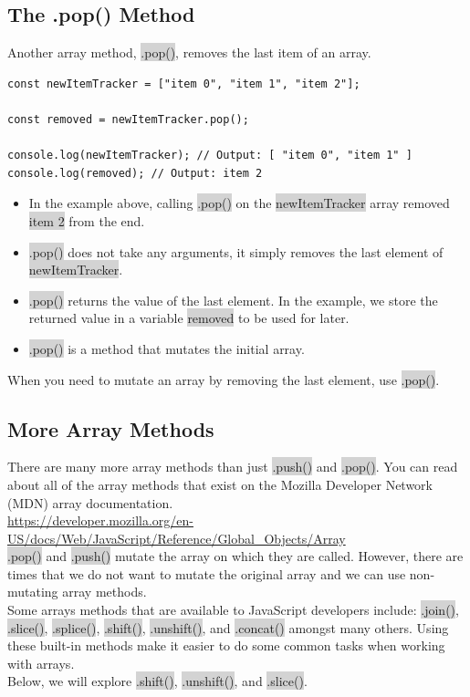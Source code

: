 \documentclass[11pt]{article}
\begin{document}
\subsection{The .pop() Method}
Another array method, \colorbox{lightgray}{.pop()}, removes the last item of an array.
\begin{lstlisting}
const newItemTracker = ["item 0", "item 1", "item 2"];

const removed = newItemTracker.pop();

console.log(newItemTracker); // Output: [ "item 0", "item 1" ]
console.log(removed); // Output: item 2
\end{lstlisting}
\begin{itemize}[leftmargin = *]
\item In the example above, calling \colorbox{lightgray}{.pop()} on the \colorbox{lightgray}{newItemTracker} array removed \colorbox{lightgray}{item 2} from the end.
\item \colorbox{lightgray}{.pop()} does not take any arguments, it simply removes the last element of \colorbox{lightgray}{newItemTracker}.
\item \colorbox{lightgray}{.pop()} returns the value of the last element. In the example, we store the returned value in a variable \colorbox{lightgray}{removed} to be used for later.
\item \colorbox{lightgray}{.pop()} is a method that mutates the initial array.

\end{itemize}
When you need to mutate an array by removing the last element, use \colorbox{lightgray}{.pop()}.

\subsection{More Array Methods}
There are many more array methods than just \colorbox{lightgray}{.push()} and \colorbox{lightgray}{.pop()}. You can read about all of the array methods that exist on the Mozilla Developer Network (MDN) array documentation. \\
\underline{https://developer.mozilla.org/en-US/docs/Web/JavaScript/Reference/Global\_Objects/Array}\\
\newline
\colorbox{lightgray}{.pop()} and \colorbox{lightgray}{.push()} mutate the array on which they are called. However, there are times that we do not want to mutate the original array and we can use non-mutating array methods. \\
\newline
Some arrays methods that are available to JavaScript developers include: \colorbox{lightgray}{.join()}, \colorbox{lightgray}{.slice()}, \colorbox{lightgray}{.splice()}, \colorbox{lightgray}{.shift()}, \colorbox{lightgray}{.unshift()}, and \colorbox{lightgray}{.concat()} amongst many others. Using these built-in methods make it easier to do some common tasks when working with arrays. \\
\newline
Below, we will explore \colorbox{lightgray}{.shift()}, \colorbox{lightgray}{.unshift()}, and \colorbox{lightgray}{.slice()}. 
\end{document}
